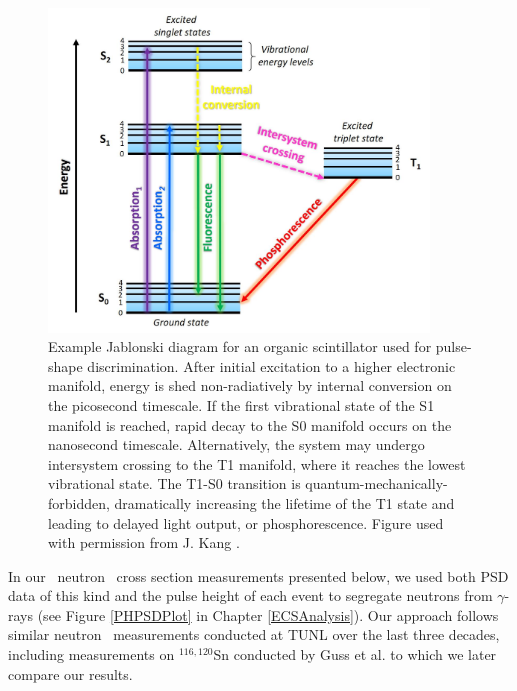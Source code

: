 \begin{figure}[h]
    \centering
    \includegraphics[width = 0.9\textwidth]{figures/JablonskiExample_KangDissertation.png}
    \caption[Example Jablonski diagram for organic scintillator]
    {
        Example Jablonski diagram for an organic scintillator used for
        pulse-shape discrimination. After initial excitation to a higher
        electronic manifold, energy is shed non-radiatively by internal
        conversion on the picosecond timescale. If the first vibrational state of the S1
        manifold is reached, rapid decay to the S0 manifold occurs on the
        nanosecond timescale. Alternatively, the system may undergo intersystem
        crossing to the T1 manifold, where it reaches the lowest vibrational
        state. The T1-S0 transition is quantum-mechanically-forbidden,
        dramatically increasing the lifetime of the T1 state and leading to
        delayed light output, or phosphorescence. Figure used with permission 
        from J. Kang \cite{KangPhDThesis}. 
    }
    \label{JablonskiExample}
\end{figure}

In our \snTwelveFour\ neutron \el\ cross section measurements presented below,
we used both PSD data of this kind and the pulse height of each
event to segregate neutrons from $\gamma$-rays (see Figure \ref{PHPSDPlot} in Chapter
\ref{ECSAnalysis}). Our approach follows similar neutron \el\ measurements
conducted at TUNL over the last three decades,
including measurements on $^{116,120}$Sn conducted by Guss et al.
\cite{Guss1989, GussPhDThesis} to which we later compare our results.

